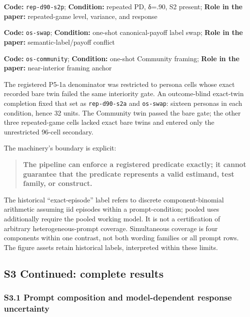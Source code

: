 \documentclass[11pt]{article}
\begin{document}
\textbf{Code:} \texttt{rep-d90-s2p}; \textbf{Condition:} repeated PD,
δ=.90, S2 present; \textbf{Role in the paper:} repeated-game level,
variance, and response

\textbf{Code:} \texttt{os-swap}; \textbf{Condition:} one-shot
canonical-payoff label swap; \textbf{Role in the paper:}
semantic-label/payoff conflict

\textbf{Code:} \texttt{os-community}; \textbf{Condition:} one-shot
Community framing; \textbf{Role in the paper:} near-interior framing
anchor

The registered P5-1a denominator was restricted to persona cells whose
exact recorded bare twin failed the same interiority gate. An
outcome-blind exact-twin completion fixed that set as
\texttt{rep-d90-s2a} and \texttt{os-swap}: sixteen personas in each
condition, hence 32 units. The Community twin passed the bare gate; the
other three repeated-game cells lacked exact bare twins and entered only
the unrestricted 96-cell secondary.

The machinery's boundary is explicit:

\begin{quote}
\textbf{The pipeline can enforce a registered predicate exactly; it
cannot guarantee that the predicate represents a valid estimand, test
family, or construct.}
\end{quote}

The historical ``exact-episode'' label refers to discrete
component-binomial arithmetic assuming iid episodes within a
prompt-condition; pooled uses additionally require the pooled working
model. It is not a certification of arbitrary heterogeneous-prompt
coverage. Simultaneous coverage is four components within one contrast,
not both wording families or all prompt rows. The figure assets retain
historical labels, interpreted within these limits.

\subsection{S3 Continued: complete
results}\label{s3-continued-complete-results}

\subsubsection{S3.1 Prompt composition and model-dependent response
uncertainty}\label{s3.1-prompt-composition-and-model-dependent-response-uncertainty}
\end{document}
